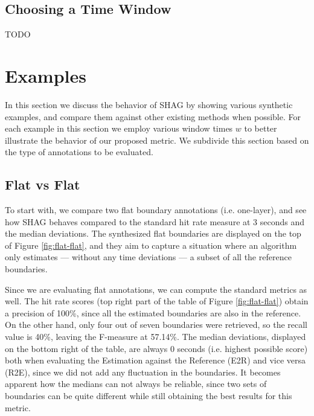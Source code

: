 \documentclass{article}
\begin{document}
\subsection{Choosing a Time Window}

TODO

\section{Examples}\label{sec:examples}

In this section we discuss the behavior of SHAG by showing various synthetic examples, and compare them against other existing methods when possible.
For each example in this section we employ various window times $w$ to better illustrate the behavior of our proposed metric.
We subdivide this section based on the type of annotations to be evaluated.

\subsection{Flat vs Flat}

To start with, we compare two flat boundary annotations (i.e. one-layer), and see how SHAG behaves compared to the standard hit rate measure at 3 seconds and the median deviations.
The synthesized flat boundaries are displayed on the top of Figure \ref{fig:flat-flat}, and they aim to capture a situation where an algorithm only estimates --- without any time deviations --- a subset of all the reference boundaries.


Since we are evaluating flat annotations, we can compute the standard metrics as well. The hit rate scores (top right part of the table of Figure \ref{fig:flat-flat}) obtain a precision of 100\%, since all the estimated boundaries are also in the reference.
On the other hand, only four out of seven boundaries were retrieved, so the recall value is 40\%, leaving the F-measure at 57.14\%.
The median deviations, displayed on the bottom right of the table, are always 0 seconds (i.e. highest possible score) both when evaluating the Estimation against the Reference (E2R) and vice versa (R2E), since we did not add any fluctuation in the boundaries.
It becomes apparent how the medians can not always be reliable, since two sets of boundaries can be quite different while still obtaining the best results for this metric.
\end{document}
